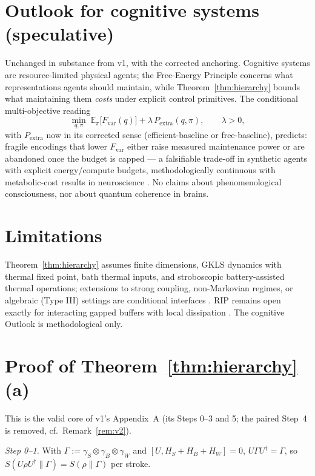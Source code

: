 \documentclass[11pt,a4paper]{article}
\theoremstyle{plain}
\theoremstyle{definition}
\theoremstyle{remark}
\newcommand{\Pextra}{P_{\mathrm{extra}}}
\begin{document}
\section{Outlook for cognitive systems (speculative)}

Unchanged in substance from v1, with the corrected anchoring. Cognitive
systems are resource-limited physical agents; the Free-Energy Principle
\cite{Friston10,ParrFriston19} concerns what representations agents should
maintain, while Theorem~\ref{thm:hierarchy} bounds what maintaining them
\emph{costs} under explicit control primitives. The conditional
multi-objective reading
\begin{equation}
\min_{q, \pi}\; \mathbb{E}_\pi\big[F_{\mathrm{var}}(q)\big] +
\lambda\, \Pextra(q, \pi), \qquad \lambda > 0,
\end{equation}
with $\Pextra$ now in its corrected sense (efficient-baseline or
free-baseline), predicts: fragile encodings that lower $F_{\mathrm{var}}$
either raise measured maintenance power or are abandoned once the budget is
capped --- a falsifiable trade-off in synthetic agents with explicit
energy/compute budgets, methodologically continuous with metabolic-cost
results in neuroscience \cite{Laughlin98,AttwellLaughlin01}. No claims about
phenomenological consciousness, nor about quantum coherence in brains.

\section{Limitations}

Theorem~\ref{thm:hierarchy} assumes finite dimensions, GKLS dynamics with
thermal fixed point, bath thermal inputs, and stroboscopic battery-assisted
thermal operations; extensions to strong coupling, non-Markovian regimes, or
algebraic (Type III) settings are conditional interfaces
\cite{MaintWork,Clustering}. RIP remains open exactly for interacting gapped
buffers with local dissipation \cite{HCut}. The cognitive Outlook is
methodological only.

\appendix

\section{Proof of Theorem~\ref{thm:hierarchy}(a)}\label{app:proof}

This is the valid core of v1's Appendix~A (its Steps 0--3 and 5; the paired
Step~4 is removed, cf.\ Remark~\ref{rem:v2}).

\emph{Step 0--1.} With $\Gamma := \gamma_S\otimes\gamma_B\otimes\gamma_W$
and $[U, H_S + H_B + H_W] = 0$, $U\Gamma U^\dagger = \Gamma$, so
$S(U\rho U^\dagger\|\Gamma) = S(\rho\|\Gamma)$ per stroke.
\end{document}
